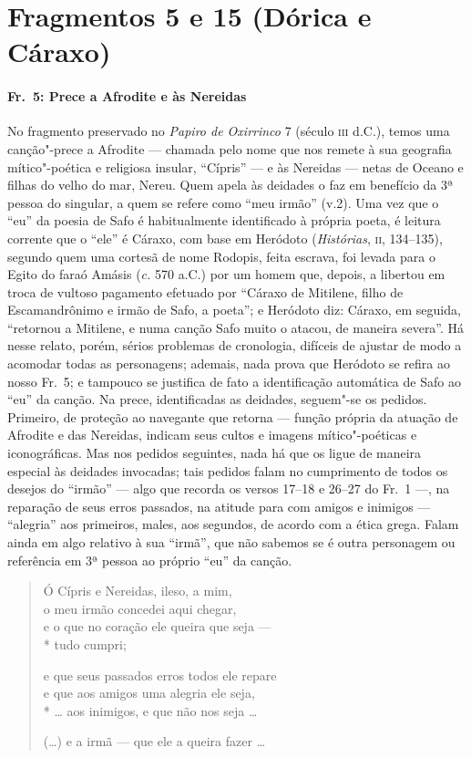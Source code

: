 \section*{Fragmentos 5 e 15 (Dórica e Cáraxo)}

\paragraph{Fr.~5: Prece a Afrodite e às Nereidas}

{\small No fragmento preservado no \textit{Papiro de Oxirrinco} 7 (século \textsc{iii} d.C.),
temos uma canção"-prece a Afrodite --- chamada pelo nome que nos remete à sua
geografia mítico"-poética e religiosa insular, “Cípris” --- e às Nereidas
--- netas de Oceano e filhas do velho do mar, Nereu. Quem apela às deidades o faz
em benefício da 3ª pessoa do singular, a quem se refere como “meu
irmão” (v.2). Uma vez que o “eu” da poesia de Safo é habitualmente
identificado à própria poeta, é leitura corrente que o “ele” é Cáraxo, com base
em Heródoto (\textit{Histórias}, \textsc{ii}, 134--135), segundo quem uma
cortesã de nome Rodopis, feita escrava, foi levada para o Egito do faraó Amásis
(\textit{c.} 570 a.C.) por um homem que, depois, a libertou em troca de vultoso
pagamento efetuado por “Cáraxo de Mitilene, filho de Escamandrônimo e
irmão de Safo, a poeta”; e Heródoto diz: Cáraxo, em seguida, “retornou
a Mitilene, e numa canção Safo muito o atacou, de maneira severa”. Há nesse
relato, porém, sérios problemas de cronologia, difíceis de ajustar de modo a
acomodar todas as personagens; ademais, nada prova que Heródoto se refira ao
nosso Fr.~5; e tampouco se justifica de fato a identificação automática de
Safo ao “eu” da canção. Na prece, identificadas as deidades, seguem"-se os
pedidos. Primeiro, de proteção ao navegante que retorna --- função própria da
atuação de Afrodite e das Nereidas, indicam seus cultos e imagens
mítico"-poéticas e iconográficas. Mas nos pedidos seguintes, nada há que os
ligue de maneira especial às deidades invocadas; tais pedidos falam no
cumprimento de todos os desejos do “irmão” --- algo que recorda os
versos 17--18 e 26--27 do Fr.~1 ---, na reparação de seus erros passados, na
atitude para com amigos e inimigos --- “alegria” aos primeiros,
males, aos segundos, de acordo com a ética grega. Falam ainda em algo
relativo à sua ``irmã'', que não sabemos se é outra personagem ou
referência em 3ª pessoa ao próprio “eu” da canção.}

\begin{verse}
Ó Cípris e Nereidas, ileso, a mim,\\
o meu irmão concedei aqui chegar,\\
e o que no coração ele queira que seja ---\\*
tudo cumpri;

e que seus passados erros todos ele repare\\
e que aos amigos uma alegria ele seja,\\*
\ldots{} aos inimigos, e que não nos seja \ldots{}

(\ldots{}) e a irmã --- que ele a queira fazer \ldots{}
\end{verse}


